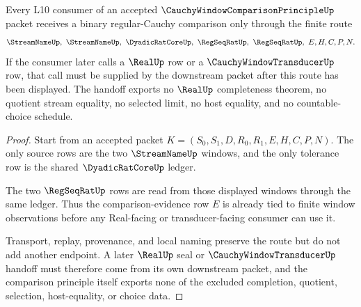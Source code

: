 \begin{theorem}
\label{thm:cauchy-window-comparison-principle-l10-handoff}
Every L10 consumer of an accepted $\CauchyWindowComparisonPrincipleUp$ packet receives a binary regular-Cauchy comparison only through the finite route
$$
\StreamNameUp,\ \StreamNameUp,\ \DyadicRatCoreUp,\ \RegSeqRatUp,\ \RegSeqRatUp,\ E,H,C,P,N .
$$
If the consumer later calls a $\RealUp$ row or a $\CauchyWindowTransducerUp$ row, that call must be supplied by the downstream packet after this route has been displayed. The handoff exports no $\RealUp$ completeness theorem, no quotient stream equality, no selected limit, no host equality, and no countable-choice schedule.
\end{theorem}
\begin{proof}
Start from an accepted packet $K=(S_0,S_1,D,R_0,R_1,E,H,C,P,N)$. The only source rows are the two $\StreamNameUp$ windows, and the only tolerance row is the shared $\DyadicRatCoreUp$ ledger.

The two $\RegSeqRatUp$ rows are read from those displayed windows through the same ledger. Thus the comparison-evidence row $E$ is already tied to finite window observations before any Real-facing or transducer-facing consumer can use it.

Transport, replay, provenance, and local naming preserve the route but do not add another endpoint. A later $\RealUp$ seal or $\CauchyWindowTransducerUp$ handoff must therefore come from its own downstream packet, and the comparison principle itself exports none of the excluded completion, quotient, selection, host-equality, or choice data.
\end{proof}



